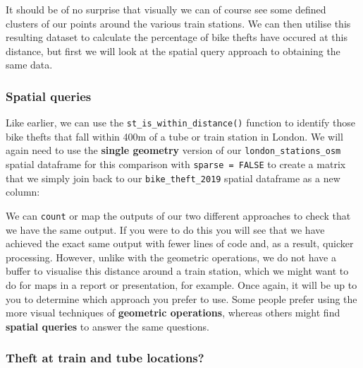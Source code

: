 \documentclass[
]{book}
\newenvironment{Shaded}{\begin{snugshade}}{\end{snugshade}}
\newcommand{\AttributeTok}[1]{\textcolor[rgb]{0.77,0.63,0.00}{#1}}
\newcommand{\CommentTok}[1]{\textcolor[rgb]{0.56,0.35,0.01}{\textit{#1}}}
\newcommand{\ConstantTok}[1]{\textcolor[rgb]{0.00,0.00,0.00}{#1}}
\newcommand{\DecValTok}[1]{\textcolor[rgb]{0.00,0.00,0.81}{#1}}
\newcommand{\FunctionTok}[1]{\textcolor[rgb]{0.00,0.00,0.00}{#1}}
\newcommand{\NormalTok}[1]{#1}
\newcommand{\OtherTok}[1]{\textcolor[rgb]{0.56,0.35,0.01}{#1}}
\newcommand{\SpecialCharTok}[1]{\textcolor[rgb]{0.00,0.00,0.00}{#1}}
\begin{document}
It should be of no surprise that visually we can of course see some defined clusters of our points around the various train stations. We can then utilise this resulting dataset to calculate the percentage of bike thefts have occured at this distance, but first we will look at the spatial query approach to obtaining the same data.

\hypertarget{spatial-queries-1}{%
\subsubsection{Spatial queries}\label{spatial-queries-1}}

Like earlier, we can use the \texttt{st\_is\_within\_distance()} function to identify those bike thefts that fall within 400m of a tube or train station in London.
We will again need to use the \textbf{single geometry} version of our \texttt{london\_stations\_osm} spatial dataframe for this comparison with \texttt{sparse\ =\ FALSE} to create a matrix that we simply join back to our \texttt{bike\_theft\_2019} spatial dataframe as a new column:

\begin{Shaded}
\end{Shaded}

We can \texttt{count} or map the outputs of our two different approaches to check that we have the same output. If you were to do this you will see that we have achieved the exact same output with fewer lines of code and, as a result, quicker processing. However, unlike with the geometric operations, we do not have a buffer to visualise this distance around a train station, which we might want to do for maps in a report or presentation, for example. Once again, it will be up to you to determine which approach you prefer to use. Some people prefer using the more visual techniques of \textbf{geometric operations}, whereas others might find \textbf{spatial queries} to answer the same questions.

\hypertarget{theft-at-train-and-tube-locations}{%
\subsubsection{Theft at train and tube locations?}\label{theft-at-train-and-tube-locations}}
\end{document}
